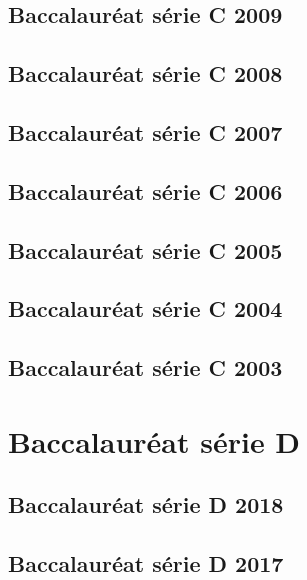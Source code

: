 \begin{corrige}
\section{Baccalauréat série C 2009}
{\color{loko2}}

\section{Baccalauréat série C 2008}
{\color{loko2}}

\section{Baccalauréat série C 2007}
{\color{loko2}}

\section{Baccalauréat série C 2006}
{\color{loko2}}

\section{Baccalauréat série C 2005}
{\color{loko2}}

\section{Baccalauréat série C 2004}
{\color{loko2}}

\section{Baccalauréat série C 2003}
{\color{loko2}}

\end{corrige}
\chapter{Baccalauréat série D}
\section{Baccalauréat série D 2018}

\newpage
\section{Baccalauréat série D 2017}

\newpage
